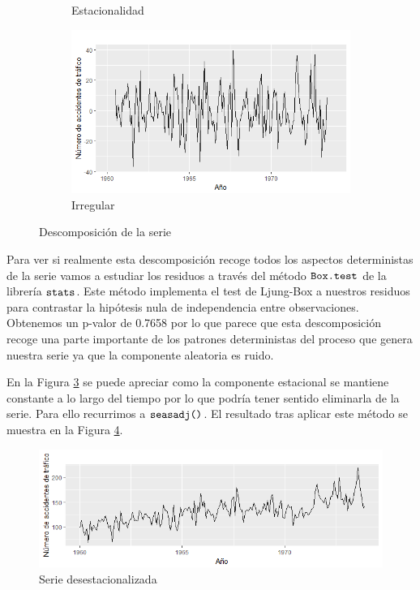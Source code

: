 \begin{figure} [t]
\begin{subfigure}{.5\textwidth}
  \caption{Estacionalidad}
  \label{fig:sfig1}
\end{subfigure}
\begin{subfigure}{.5\textwidth}
  \centering
  \includegraphics[width=.8\linewidth]{Images/Modelizacion/33-irre.png}
  \caption{Irregular}
  \label{fig:sfig2}
\end{subfigure}
\caption{Descomposición de la serie }
\label{descompose}
\end{figure}

Para ver si realmente esta descomposición recoge todos los aspectos deterministas de la serie vamos a estudiar los residuos a través del método $\verb!Box.test!$ de la librería $\verb!stats!$. Este método implementa el test de Ljung-Box a nuestros residuos para contrastar la hipótesis nula de independencia entre observaciones. Obtenemos un p-valor de 0.7658 por lo que parece que esta descomposición recoge una parte importante de los patrones deterministas del proceso que genera nuestra serie ya que la componente aleatoria es ruido.

En la Figura \ref{descompose} se puede apreciar como la componente estacional se mantiene constante a lo largo del tiempo por lo que podría tener sentido eliminarla de la serie. Para ello recurrimos a $\verb!seasadj()!$. El resultado tras aplicar este método se muestra en la Figura \ref{deses}.
\begin{figure}
    \centering
    \centerline{\includegraphics[scale = 0.7]{Images/Modelizacion/34.png}}
    \caption{Serie desestacionalizada}
    \label{deses}
\end{figure}

